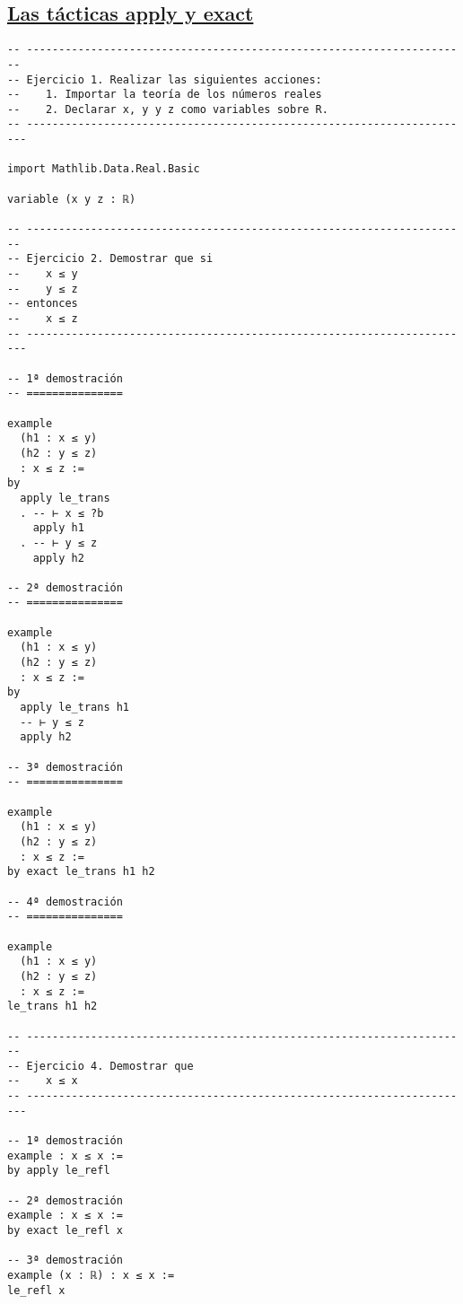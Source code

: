 \subsection{\href{./src/Basicos/Las\_tacticas\_apply\_y\_exact.lean}{Las tácticas apply y exact}}
\label{sec:orgf849fc9}
\begin{verbatim}
-- ---------------------------------------------------------------------
-- Ejercicio 1. Realizar las siguientes acciones:
--    1. Importar la teoría de los números reales
--    2. Declarar x, y y z como variables sobre R.
-- ----------------------------------------------------------------------

import Mathlib.Data.Real.Basic

variable (x y z : ℝ)

-- ---------------------------------------------------------------------
-- Ejercicio 2. Demostrar que si
--    x ≤ y
--    y ≤ z
-- entonces
--    x ≤ z
-- ----------------------------------------------------------------------

-- 1ª demostración
-- ===============

example
  (h1 : x ≤ y)
  (h2 : y ≤ z)
  : x ≤ z :=
by
  apply le_trans
  . -- ⊢ x ≤ ?b
    apply h1
  . -- ⊢ y ≤ z
    apply h2

-- 2ª demostración
-- ===============

example
  (h1 : x ≤ y)
  (h2 : y ≤ z)
  : x ≤ z :=
by
  apply le_trans h1
  -- ⊢ y ≤ z
  apply h2

-- 3ª demostración
-- ===============

example
  (h1 : x ≤ y)
  (h2 : y ≤ z)
  : x ≤ z :=
by exact le_trans h1 h2

-- 4ª demostración
-- ===============

example
  (h1 : x ≤ y)
  (h2 : y ≤ z)
  : x ≤ z :=
le_trans h1 h2

-- ---------------------------------------------------------------------
-- Ejercicio 4. Demostrar que
--    x ≤ x
-- ----------------------------------------------------------------------

-- 1ª demostración
example : x ≤ x :=
by apply le_refl

-- 2ª demostración
example : x ≤ x :=
by exact le_refl x

-- 3ª demostración
example (x : ℝ) : x ≤ x :=
le_refl x
\end{verbatim}

